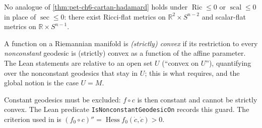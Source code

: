 \begin{remark}
  \label{rem:pet-ch6-cartan-hadamard-fails-ricci}
  No analogue of \cref{thm:pet-ch6-cartan-hadamard} holds under $\operatorname{Ric}\le0$
  or $\operatorname{scal}\le0$ in place of $\sec\le0$: there exist Ricci-flat metrics on
  $\mathbb{R}^2\times S^{n-2}$ and scalar-flat metrics on $\mathbb{R}\times S^{n-1}$.
\end{remark}

\begin{definition}
  \label{def:pet-ch6-convex-function}
  \leanok
  A function on a Riemannian manifold is \emph{(strictly) convex} if its
  restriction to every \emph{nonconstant} geodesic is (strictly) convex as a
  function of the affine parameter. The Lean statements are relative to an open
  set $U$ (``convex on $U$''), quantifying over the nonconstant geodesics that
  stay in $U$; this is what 
  requires, and the global notion is the case $U=M$.

  Constant geodesics must be excluded: $f\circ c$ is then constant and cannot
  be strictly convex. The Lean predicate \texttt{IsNonconstantGeodesicOn}
  records this guard. The criterion used in
   is
  $(f_0\circ c)''=\operatorname{Hess}f_0(\dot c,\dot c)>0$.
\end{definition}

